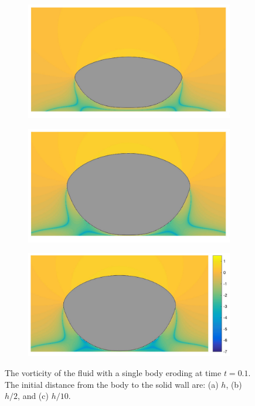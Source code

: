 \documentclass{jfm}
\begin{document}
\begin{figure}
\begin{center}
\begin{subfigure}[b]{0.32\textwidth}
\includegraphics[height = 0.53\textwidth]{./figs/1b_0d4r1h_vort}
\caption{}
\end{subfigure}
\begin{subfigure}[b]{0.32\textwidth}
\includegraphics[height = 0.53\textwidth]{./figs/1b_0d4r0d5h_vort}
\caption{}
\end{subfigure}
\begin{subfigure}[b]{0.32\textwidth}
\includegraphics[height = 0.53\textwidth]{./figs/1b_0d4r0d1h_vort}
\caption{}
\end{subfigure}
\caption{\label{fig:NearWall_vort} The vorticity of the fluid with a
single body eroding at time $t=0.1$. The initial distance from the body
to the solid wall are: (a) $h$, (b) $h/2$, and (c) $h/10$.}
\end{center}
\end{figure}
\end{document}
